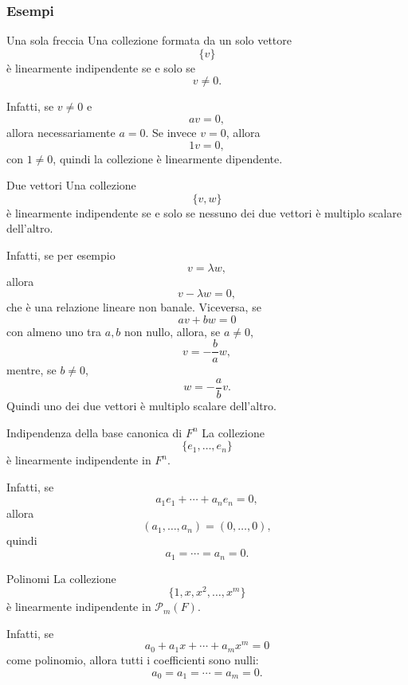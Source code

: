 \documentclass[a4paper]{article}
\begin{document}
\subsubsection{Esempi}

\begin{snippetexample}{Una sola freccia}
    Una collezione formata da un solo vettore
    \[
        \{v\}
    \]
    è linearmente indipendente se e solo se
    \[
        v\neq 0.
    \]

    Infatti, se \(v\neq 0\) e
    \[
        av=0,
    \]
    allora necessariamente \(a=0\). Se invece \(v=0\), allora
    \[
        1v=0,
    \]
    con \(1\neq 0\), quindi la collezione è linearmente dipendente.
\end{snippetexample}

\begin{snippetexample}{Due vettori}
    Una collezione
    \[
        \{v,w\}
    \]
    è linearmente indipendente se e solo se nessuno dei due vettori è multiplo scalare dell'altro.

    Infatti, se per esempio
    \[
        v=\lambda w,
    \]
    allora
    \[
        v-\lambda w=0,
    \]
    che è una relazione lineare non banale. Viceversa, se
    \[
        av+bw=0
    \]
    con almeno uno tra \(a,b\) non nullo, allora, se \(a\neq 0\),
    \[
        v=-\frac{b}{a}w,
    \]
    mentre, se \(b\neq 0\),
    \[
        w=-\frac{a}{b}v.
    \]
    Quindi uno dei due vettori è multiplo scalare dell'altro.
\end{snippetexample}

\begin{snippetexample}{Indipendenza della base canonica di \(F^n\)}
    La collezione
    \[
        \{e_1,\ldots,e_n\}
    \]
    è linearmente indipendente in \(F^n\).

    Infatti, se
    \[
        a_1e_1+\cdots+a_ne_n=0,
    \]
    allora
    \[
        (a_1,\ldots,a_n)=(0,\ldots,0),
    \]
    quindi
    \[
        a_1=\cdots=a_n=0.
    \]
\end{snippetexample}

\begin{snippetexample}{Polinomi}
    La collezione
    \[
        \{1,x,x^2,\ldots,x^m\}
    \]
    è linearmente indipendente in \(\mathcal{P}_m(F)\).

    Infatti, se
    \[
        a_0+a_1x+\cdots+a_mx^m=0
    \]
    come polinomio, allora tutti i coefficienti sono nulli:
    \[
        a_0=a_1=\cdots=a_m=0.
    \]
\end{snippetexample}
\end{document}
